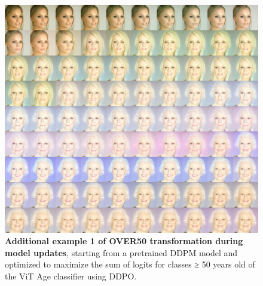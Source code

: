 \begin{appendixs}
        \begin{figure}
            \centering
            \includegraphics[scale=2.80]{img/results/over50_7.png}
            \vspace{-0pt}  %
            \captionsetup{width=\textwidth} %
            \caption{\textbf{Additional example 1 of OVER50 transformation during model updates}, starting from a pretrained DDPM model and optimized to maximize the sum of logits for classes ≥ 50 years old of the ViT Age classifier using DDPO.}
            \label{fig:ddpm-to-ddpo-over50-extra1}
        \end{figure}


\end{appendixs}
